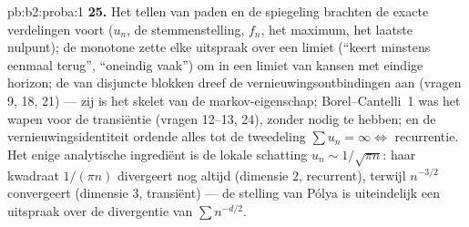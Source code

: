 \begin{solution}{pb:b2:proba:1}
\textbf{25.} Het tellen van paden en de spiegeling brachten de
exacte verdelingen voort ($u_n$, de stemmenstelling, $f_n$, het
maximum, het laatste nulpunt); de monotone  zette elke
uitspraak over een limiet (``keert minstens eenmaal terug'',
``oneindig vaak'') om in een limiet van kansen met eindige horizon;
de  van disjuncte blokken dreef de
vernieuwingsontbindingen aan (vragen 9, 18, 21) --- zij is het
 skelet van de markov-eigenschap; Borel--Cantelli~1 was
het wapen voor de transiëntie (vragen 12--13, 24), zonder
 nodig te hebben; en de vernieuwingsidentiteit
ordende alles tot de tweedeling $\sum u_n = \infty \iff$
recurrentie. Het enige analytische ingrediënt is de lokale
schatting $u_n \sim 1/\sqrt{\pi n}$: haar kwadraat $1/(\pi n)$
divergeert nog altijd (dimensie $2$, recurrent), terwijl
$n^{-3/2}$ convergeert (dimensie $3$, transiënt) --- de stelling
van Pólya is uiteindelijk een uitspraak over de divergentie van
$\sum n^{-d/2}$.
\end{solution}
